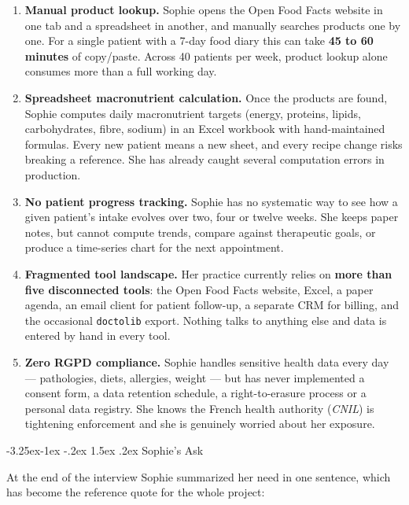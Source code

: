 \documentclass[a4paper,11pt,oneside,openany]{report}
\makeatletter
\renewcommand\subsection{\@startsection{subsection}{2}{\z@}%
  {-3.25ex\@plus -1ex \@minus -.2ex}%
  {1.5ex \@plus .2ex}%
  {\normalfont\large\bfseries\color{ntdarkgreen}}}
\newcommand{\off}{Open Food Facts}
\newcommand{\rgpd}{RGPD}
\makeatother
\begin{document}
\begin{enumerate}[nosep]
  \item \textbf{Manual product lookup.} Sophie opens the
        \off{} website in one tab and a spreadsheet in another, and
        manually searches products one by one. For a single patient
        with a 7-day food diary this can take \textbf{45 to 60
        minutes} of copy/paste. Across 40 patients per week, product
        lookup alone consumes more than a full working day.
  \item \textbf{Spreadsheet macronutrient calculation.} Once the
        products are found, Sophie computes daily macronutrient
        targets (energy, proteins, lipids, carbohydrates, fibre,
        sodium) in an Excel workbook with hand-maintained formulas.
        Every new patient means a new sheet, and every recipe change
        risks breaking a reference. She has already caught several
        computation errors in production.
  \item \textbf{No patient progress tracking.} Sophie has no
        systematic way to see how a given patient's intake evolves
        over two, four or twelve weeks. She keeps paper notes, but
        cannot compute trends, compare against therapeutic goals, or
        produce a time-series chart for the next appointment.
  \item \textbf{Fragmented tool landscape.} Her practice currently
        relies on \textbf{more than five disconnected tools}: the
        \off{} website, Excel, a paper agenda, an email client for
        patient follow-up, a separate CRM for billing, and the
        occasional \texttt{doctolib} export. Nothing talks to
        anything else and data is entered by hand in every tool.
  \item \textbf{Zero \rgpd{} compliance.} Sophie handles sensitive
        health data every day --- pathologies, diets, allergies,
        weight --- but has never implemented a consent form, a data
        retention schedule, a right-to-erasure process or a personal
        data registry. She knows the French health authority
        (\textit{CNIL}) is tightening enforcement and she is
        genuinely worried about her exposure.
\end{enumerate}

\subsection{Sophie's Ask}

At the end of the interview Sophie summarized her need in one
sentence, which has become the reference quote for the whole project:
\end{document}
